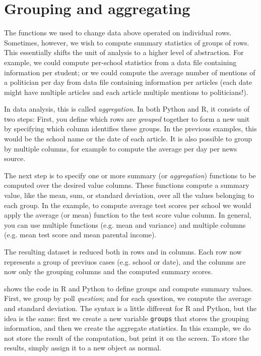 \section{Grouping and aggregating} \label{sec:grouping}

The functions we used to change data above operated on individual rows.
Sometimes, however, we wish to compute summary statistics of groups of rows.
This essentially shifts the unit of analysis to a higher level of abstraction.
For example, we could compute per-school statistics from a data file containing information per student;
or we could compute the average number of mentions of a politician per day from data file containing information per articles (each date might have multiple articles and each article multiple mentions to politicians!).

In data analysis, this is called \emph{aggregation}.
In both Python and R, it consists of two steps:
First, you define which rows are \emph{grouped} together to form a new unit
by specifying which column identifies these groups.
In the previous examples, this would be the school name or the date of each article.
It is also possible to group by multiple columns, for example to compute the average per day per news source.

The next step is to specify one or more summary (or \emph{aggregation}) functions to be computed over the desired value columns.
These functions compute a summary value, like the mean, sum, or standard deviation, over all the values belonging to each group.
In the example, to compute average test scores per school we would apply the average (or mean) function to the test score value column.
In general, you can use multiple functions (e.g.  mean and variance) and multiple columns (e.g. mean test score and mean parental income).

The resulting dataset is reduced both in rows and in columns.
Each row now represents a group of previuos cases (e.g. school or date),
and the columns are now only the grouping columns and the computed summary scores.

 shows the code in R and Python to define groups and compute summary values.
First, we group by poll \emph{question}; and for each question, we compute the average and standard deviation.
The syntax is a little different for R and Python, but the idea is the same:
first we create a new variable \verb+groups+ that stores the grouping information,
and then we create the aggregate statistics.
In this example, we do not store the result of the computation, but print it on the screen.
To store the results, simply assign it to a new object as normal.

